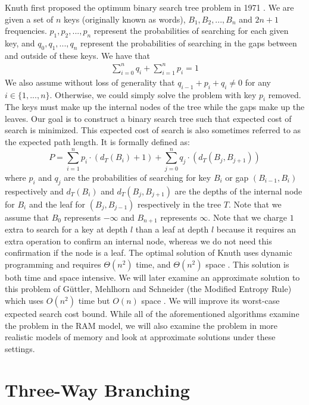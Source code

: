 \documentclass[letterpaper,12pt,titlepage,oneside,final]{book}
\theoremstyle{plain}
\begin{document}
Knuth first proposed the optimum binary search tree problem in 1971 \cite{knuth1971optimum}. We are given a set of $n$ keys (originally known as words), $B_1, B_2, ..., B_n$ and $2n+1$ frequencies. ${p_1, p_2, ..., p_n}$ represent the probabilities of searching for each given key, and ${q_0, q_1, ..., q_n}$ represent the probabilities of searching in the gaps between and outside of these keys. We have that
\begin{align*}
\sum\limits_{i=0}^n q_i + \sum\limits_{i=1}^n p_i = 1
 \end{align*}
We also assume without loss of generality that $q_{i-1}+p_i+q_i \neq 0$ for any $i \in \{1,...,n\}$. Otherwise, we could simply solve the problem with key $p_i$ removed. The keys must make up the internal nodes of the tree while the gaps make up the leaves. Our goal is to construct a binary search tree such that expected cost of search is minimized. This expected cost of search is also sometimes referred to as the expected path length. It is formally defined as: 
\begin{equation}\label{1.1}
P = \sum_{i=1}^{n} p_i \cdot (d_T(B_i)+1) + \sum_{j=0}^{n} q_j \cdot(d_T(B_j, B_{j+1}))
\end{equation}
where $p_i$ and $q_j$ are the probabilities of searching for key $B_i$ or gap $(B_{i-1}, B_i)$ respectively and $d_T(B_i)$ and $d_T(B_j, B_{j+1})$ are the depths of the internal node for $B_i$ and the leaf for $(B_j, B_{j-1})$ respectively in the tree $T$. Note that we assume that $B_0$ represents $- \infty$ and $B_{n+1}$ represents $\infty$. Note that we charge $1$ extra to search for a key at depth $l$ than a leaf at depth $l$ because it requires an extra operation to confirm an internal node, whereas we do not need this confirmation if the node is a leaf. The optimal solution of Knuth uses dynamic programming and requires $\Theta(n^2)$ time, and $\Theta(n^2)$ space \cite{knuth1971optimum}. This solution is both time and space intensive. We will later examine an approximate solution to this problem of G{\"u}ttler, Mehlhorn and Schneider (the Modified Entropy Rule) which uses $O(n^2)$ time but $O(n)$ space \cite{guttler1980binary}. We will improve its worst-case expected search cost bound. While all of the aforementioned algorithms examine the problem in the RAM model, we will also examine the problem in more realistic models of memory and look at approximate solutions under these settings.

\section{Three-Way Branching}
\end{document}
